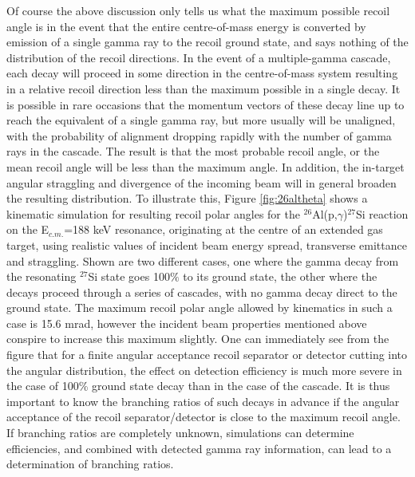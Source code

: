 Of course the above discussion only tells us what the maximum possible recoil angle is in the event that the entire centre-of-mass energy is converted by emission of a single gamma ray to the recoil ground state, and says nothing of the distribution of the recoil directions. In the event of a multiple-gamma cascade, each decay will proceed in some direction in the centre-of-mass system resulting in a relative recoil direction less than the maximum possible in a single decay. It is possible in rare occasions that the momentum vectors of these decay line up to reach the equivalent of a single gamma ray, but more usually will be unaligned, with the probability of alignment dropping rapidly with the number of gamma rays in the cascade. The result is that the most probable recoil angle, or the mean recoil angle will be less than the maximum angle. In addition, the in-target angular straggling and divergence of the incoming beam will in general broaden the resulting distribution.
To illustrate this, Figure \ref{fig:26altheta} shows a kinematic simulation for resulting recoil polar angles for the $^{26}$Al(p,$\gamma$)$^{27}$Si reaction on the E$_{c.m.}$=188 keV resonance, originating at the centre of an extended gas target, using realistic values of incident beam energy spread, transverse emittance and straggling. Shown are two different cases, one where the gamma decay from the resonating $^{27}$Si state goes 100$\%$ to its ground state, the other where the decays proceed through a series of cascades, with no gamma decay direct to the ground state. The maximum recoil polar angle allowed by kinematics in such a case is 15.6 mrad, however the incident beam properties mentioned above conspire to increase this maximum slightly. 
One can immediately see from the figure that for a finite angular acceptance recoil separator or detector cutting into the angular distribution, the effect on detection efficiency is much more severe in the case of 100\% ground state decay than in the case of the cascade. It is thus important to know the branching ratios of such decays in advance if the angular acceptance of the recoil separator/detector is close to the maximum recoil angle. If branching ratios are completely unknown, simulations can determine efficiencies, and combined with detected gamma ray information, can lead to a determination of branching ratios.    

